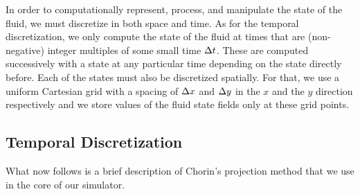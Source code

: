\documentclass[11pt,a4paper,twoside,openright]{report}
\begin{document}
In order to computationally represent, process, and manipulate the state of the fluid, we must discretize in both space and time. As for the temporal discretization, we only compute the state of the fluid at times that are (non-negative) integer multiples of some small time $\Delta t$. These are computed successively with a state at any particular time depending on the state directly before. Each of the states must also be discretized spatially. For that, we use a uniform Cartesian grid with a spacing of $\Delta x$ and $\Delta y$ in the $x$ and the $y$ direction respectively and we store values of the fluid state fields only at these grid points.

\subsection{Temporal Discretization}
What now follows is a brief description of Chorin's projection method that we use in the core of our simulator.
\end{document}
